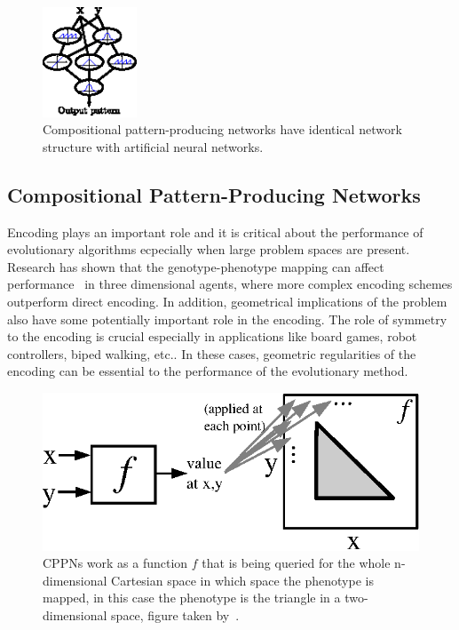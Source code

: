 \begin{figure}[t!]
\centering
\includegraphics[width=0.25\textwidth]{../Figures/Misc/cppnNetwork.eps}
\caption{Compositional pattern-producing networks have identical network structure with artificial neural networks.}
\label{fig:cppnNetwork}
\end{figure}



\subsection{Compositional Pattern-Producing Networks}
\label{CPPN}

Encoding plays an important role and it is critical about the performance of evolutionary algorithms ecpecially when large problem spaces are present. Research has shown that the genotype-phenotype mapping can affect performance~\citep{komosinski2001comparison} in three dimensional agents, where more complex encoding schemes outperform direct encoding. In addition, geometrical implications of the problem also have some potentially important role in the encoding. The role of symmetry to the encoding is crucial especially in applications like board games, robot controllers, biped walking, etc.. In these cases, geometric regularities of the encoding can be essential to the performance of the evolutionary method.

\begin{figure}[t!]
\centering
\includegraphics{../Figures/Misc/cppnResolution.eps}
\caption{CPPNs work as a function $f$ that is being queried for the whole n-dimensional Cartesian space in which space the phenotype is mapped, in this case the phenotype is the triangle in a two-dimensional space, figure taken by~\citep{stanley2007compositional}.}
\label{fig:cppnResolution}
\end{figure}


